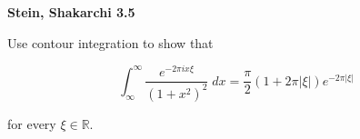 \textbf{Stein, Shakarchi 3.5}

Use contour integration to show that

$$
\int_{\infty}^{\infty} { \frac{e^{-2 \pi i x \xi}}{\left( 1 + x^2 \right)^2} \; dx } = \frac{\pi}{2} (1 + 2 \pi |\xi|) e^{-2 \pi |\xi|}
$$

for every $\xi \in \mathbb{R}$.

\begin{solution}
  \ \\
\end{solution}